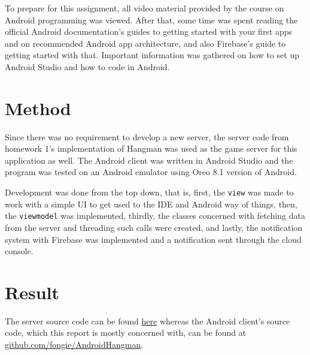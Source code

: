 \documentclass[a4paper]{scrartcl}
\def\code#1{\texttt{#1}}
\begin{document}
To prepare for this assignment, all video material provided by the course on Android programming was viewed. After that, some time was spent reading the official Android documentation's guides to getting started with your first apps and on recommended Android app architecture, and also Firebase's guide to getting started with that. Important information was gathered on how to set up Android Studio and how to code in Android.

\section{Method}

\noindent Since there was no requirement to develop a new server, the server code from homework 1's implementation of Hangman was used as the game server for this application as well. The Android client was written in Android Studio and the program was tested on an Android emulator using Oreo 8.1 version of Android.

Development was done from the top down, that is, first, the \code{view} was made to work with a simple UI to get used to the IDE and Android way of things, then, the \code{viewmodel} was implemented, thirdly, the classes concerned with fetching data from the server and threading such calls were created, and lastly, the notification system with Firebase was implemented and a notification sent through the cloud console.

\section{Result}

\noindent The server source code can be found \href{https://github.com/fongie/Hangman/tree/master/hangmanserver}{here} whereas the Android client's source code, which this report is mostly concerned with, can be found at \href{https://github.com/fongie/AndroidHangman}{github.com/fongie/AndroidHangman}.
\end{document}
